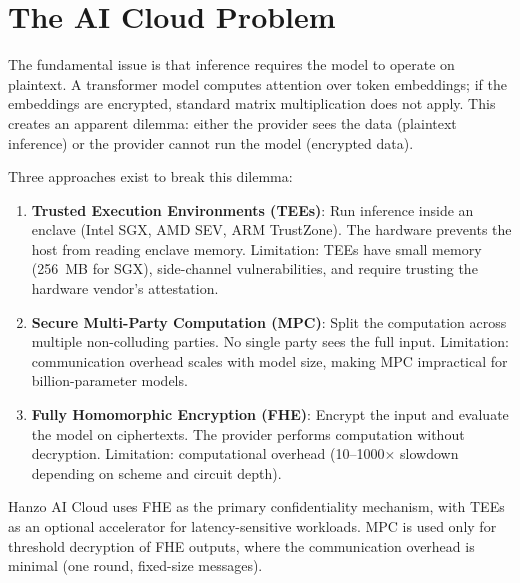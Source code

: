 \section{The AI Cloud Problem}

\label{sec:problem}

The fundamental issue is that inference requires the model to operate on
plaintext. A transformer model computes attention over token embeddings; if
the embeddings are encrypted, standard matrix multiplication does not apply.
This creates an apparent dilemma: either the provider sees the data (plaintext
inference) or the provider cannot run the model (encrypted data).

Three approaches exist to break this dilemma:

\begin{enumerate}[leftmargin=1.4em]
    \item \textbf{Trusted Execution Environments (TEEs)}: Run inference inside
    an enclave (Intel SGX, AMD SEV, ARM TrustZone). The hardware prevents the
    host from reading enclave memory. Limitation: TEEs have small memory
    (256~MB for SGX), side-channel vulnerabilities, and require trusting the
    hardware vendor's attestation.
    \item \textbf{Secure Multi-Party Computation (MPC)}: Split the computation
    across multiple non-colluding parties. No single party sees the full
    input. Limitation: communication overhead scales with model size,
    making MPC impractical for billion-parameter models.
    \item \textbf{Fully Homomorphic Encryption (FHE)}: Encrypt the input and
    evaluate the model on ciphertexts. The provider performs computation
    without decryption. Limitation: computational overhead (10--1000$\times$
    slowdown depending on scheme and circuit depth).
\end{enumerate}

Hanzo AI Cloud uses FHE as the primary confidentiality mechanism, with TEEs as
an optional accelerator for latency-sensitive workloads. MPC is used only for
threshold decryption of FHE outputs, where the communication overhead is
minimal (one round, fixed-size messages).

